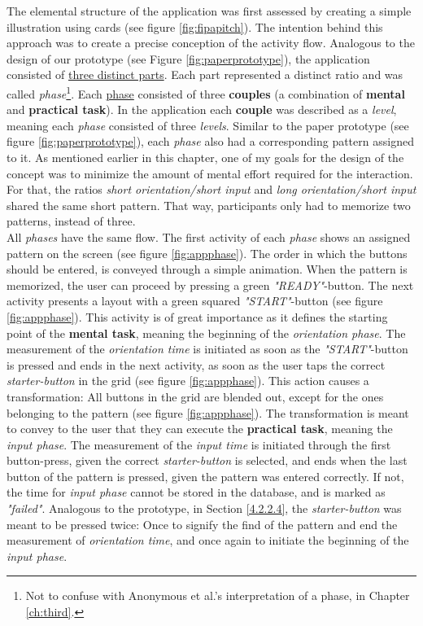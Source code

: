 The elemental structure of the application was first assessed by creating a simple illustration using cards (see figure \ref{fig:fipapitch}). The intention behind this approach was to create a precise conception of the activity flow. Analogous to the design of our prototype (see Figure \ref{fig:paperprototype}), the application consisted of \underline{three distinct parts}. Each part represented a distinct ratio and was called  \textit{phase}\footnote{Not to confuse with Anonymous et al.'s interpretation of a phase, in Chapter \ref{ch:third}.}. 
Each \underline{phase} consisted of three \textbf{couples} (a combination of \textbf{mental} and \textbf{practical task}). In the application each \textbf{couple} was described as a \textit{level}, meaning each \textit{phase} consisted of three \textit{levels}. Similar to the paper prototype (see figure \ref{fig:paperprototype}), each \textit{phase} also had a corresponding pattern assigned to it. As mentioned earlier in this chapter, one of my goals for the design of the concept was to minimize the amount of mental effort required for the interaction. For that, the ratios \textit{short orientation/short input} and \textit{long orientation/short input} shared the same short pattern. That way, participants only had to memorize two patterns, instead of three.\\

All \textit{phases} have the same flow. The first activity of each \textit{phase} shows an assigned pattern on the screen (see figure \ref{fig:appphase}). The order in which the buttons should be entered, is conveyed through a simple animation. When the pattern is memorized, the user can proceed by pressing a green \textit{"READY"}-button. The next activity presents a layout with a green squared \textit{"START"}-button (see figure \ref{fig:appphase}). This activity is of great importance as it defines the starting point of the \textbf{mental task}, meaning the beginning of the \textit{orientation phase}. The measurement of the \textit{orientation time} is initiated as soon as the \textit{"START"}-button is pressed and ends in the next activity, as soon as the user taps the correct \textit{starter-button} in the grid (see figure \ref{fig:appphase}). This action causes a transformation: All buttons in the grid are blended out, except for the ones belonging to the pattern (see figure \ref{fig:appphase}). The transformation is meant to convey to the user that they can execute the \textbf{practical task}, meaning the \textit{input phase}. The measurement of the \textit{input time} is initiated through the first button-press, given the correct \textit{starter-button} is selected, and ends when the last button of the pattern is pressed, given the pattern was entered correctly. If not, the time for \textit{input phase} cannot be stored in the database, and is marked as \textit{"failed"}. Analogous to the prototype, in Section \ref{4.2.2.4}, the \textit{starter-button} was meant to be pressed twice: Once to signify the find of the pattern and end the measurement of \textit{orientation time}, and once again to initiate the beginning of the \textit{input phase}. 

